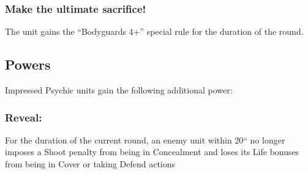 \subsubsection*{Make the ultimate sacrifice!} The unit gains the “Bodyguards 4+” special rule for the duration of the round.


\subsection*{Powers}

Impressed Psychic units gain the following additional power:

\subsubsection*{Reveal:} For the duration of the current round, an enemy unit within 20`` no longer imposes a Shoot penalty from being in Concealment and loses its Life bonuses from being in Cover or taking Defend actions


\pagebreak



